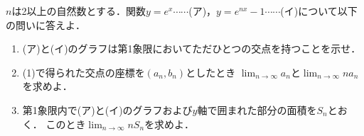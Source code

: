 \documentclass[../../main.tex]{subfiles}
\begin{document}
$n$は2以上の自然数とする．関数$y=e^x\cdots\cdots$(ア)，$y=e^{nx}-1\cdots\cdots$(イ)について以下の問いに答えよ．
\begin{enumerate}
  \item (ア)と(イ)のグラフは第1象限においてただひとつの交点を持つことを示せ．
  \item (1)で得られた交点の座標を$(a_n,b_n)$としたとき
    $\displaystyle\lim_{n \to \infty}a_n$と$\displaystyle\lim_{n \to \infty}na_n$を求めよ．
  \item 第1象限内で(ア)と(イ)のグラフおよび$y$軸で囲まれた部分の面積を$S_n$とおく．
    このとき$\displaystyle\lim_{n \to \infty}nS_n$を求めよ．
\end{enumerate}
\end{document}
